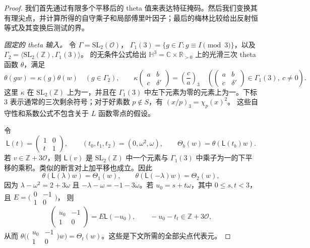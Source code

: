 \documentclass[11pt,a4paper]{article}
\numberwithin{equation}{section}
\numberwithin{figure}{section}
\theoremstyle{definition}
\theoremstyle{remark}
\begin{document}
\begin{proof}
我们首先通过有限多个平移后的 theta 值来表达特征掩码。然后我们变换其有理尖点，并计算所得的自守乘子和局部傅里叶因子；最后的梅林比较给出反射恒等式及其变换后测试的界。

\emph{固定的 theta 输入。}
令 $\Gamma=\mathrm{SL}_2(\mathcal O)$，
$\Gamma_1(3)=\{g\in\Gamma:g\equiv I\pmod3\}$，以及
$\Gamma_2=\langle\mathrm{SL}_2(\mathbb Z),\Gamma_1(3)\rangle$。
\cite[Equations (5.4), (5.7), (5.9), and (5.12)--(5.17)]{DR}
的无条件公式给出 $\mathbb H^3=\mathbb C\times\mathbb R_{>0}$ 上的光滑三次 theta 函数 $\theta$，满足
\[
 \theta(gw)=\kappa(g)\theta(w)\quad(g\in\Gamma_2),\qquad
 \kappa\!\begin{pmatrix}a&b\\c&\delta'\end{pmatrix}
   =\left(\frac ca\right)_3\quad
   \left(\begin{pmatrix}a&b\\c&\delta'\end{pmatrix}\in\Gamma_1(3),\ c\ne0\right).
\]
这里 $\kappa$ 在 $\mathrm{SL}_2(\mathbb Z)$ 上为一，并且在 $\Gamma_1(3)$ 中左下元素为零的元素上为一。下标 $3$ 表示通常的三次剩余符号；对于好素数 $p\notin S$，有 $(x/p)_3=\chi_p(x)^2$。
这些自守性和系数公式不包含关于 $L$ 函数零点的假设。

令
\[
 \mathsf L(t)=\begin{pmatrix}1&0\\t&1\end{pmatrix},\qquad
 (t_0,t_1,t_2)=(0,\omega^2,\omega),\qquad
 \Theta_b(w)=\theta(\mathsf L(t_b)w).
\]
若 $v\in\mathbb Z+3\mathcal O$，则 $\mathsf L(v)$ 是 $\mathrm{SL}_2(\mathbb Z)$ 中一个元素与 $\Gamma_1(3)$ 中乘子为一的下平移的乘积。类似的断言对上加平移也成立。因此
\[
 \theta(\mathsf L(\lambda)w)=\Theta_1(w),\qquad
 \theta(\mathsf L(-\lambda)w)=\Theta_2(w),
\]
因为 $\lambda-\omega^2=2+3\omega$ 且
$-\lambda-\omega=-1-3\omega$。若 $u_0=s+t\omega$，其中
$0\le s,t<3$，且 $E=\bigl(\begin{smallmatrix}0&-1\\1&0\end{smallmatrix}\bigr)$，
则
\[
 \begin{pmatrix}u_0&-1\\1&0\end{pmatrix}=E\mathsf L(-u_0),
 \qquad -u_0-t_t\in\mathbb Z+3\mathcal O,
\]
从而 $\theta\bigl(\bigl(\begin{smallmatrix}u_0&-1\\1&0\end{smallmatrix}\bigr)w\bigr)
=\Theta_t(w)$。这些是下文所需的全部尖点代表元。


\end{proof}
\end{document}
